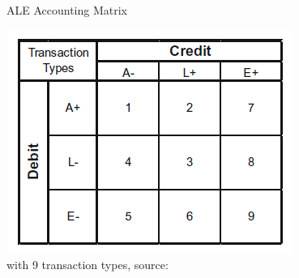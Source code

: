 





%




\begin{figure}
	\centering
	\caption{ALE Accounting Matrix}
	\label{fig:ale-accounting---schwaiger}
	\includegraphics[width=0.4\linewidth]{"../figures/ALE Accounting - Schwaiger"}
	\caption*{with 9 transaction types, source: \cite{schwaiger2015aleandrea}}
\end{figure}

